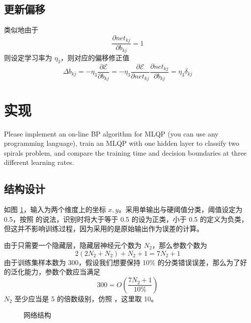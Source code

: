     \subsection{更新偏移}

    类似地由于
    \begin{equation*}
        \frac{\partial\mathit{net}_{kj}}{\partial b_{kj}} = 1
    \end{equation*}
    则设定学习率为 $\eta_3$，则对应的偏移修正值
    \begin{equation}\label{eq:bias}
        \Delta b_{kj} = -\eta_3\frac{\partial\mathcal{E}}{\partial b_{kj}}  = -\eta_3\frac{\partial\mathcal{E}}{\partial\mathit{net}_{kj}}\frac{\partial\mathit{net}_{kj}}{\partial b_{kj}} = \eta_3\delta_{kj}
    \end{equation}

    \section{实现}
    \begin{problem}
        Please implement an on-line BP algorithm for MLQP
(you can use any programming language), train an MLQP
with one hidden layer to classify two spirals problem,
and compare the training time and decision boundaries at
three different learning rates.
    \end{problem}

    \subsection{结构设计}

    如图 \ref{fig:network}，输入为两个维度上的坐标 $x,y$。采用单输出与硬阈值分类，阈值设定为 0.5，按照 \cite{gate} 的说法，识别时将大于等于 0.5 的设为正类，小于 0.5 的定义为负类，但这并不影响训练过程，因为采用的是原始输出作为误差的计算。

    由于只需要一个隐藏层，隐藏层神经元个数为 $N_2$，那么参数个数为
    \begin{equation*}
        2(2N_2+N_2) + N_2 + 1 = 7N_2 + 1
    \end{equation*}
    由于训练集样本数为 300，假设我们想要保持 10\% 的分类错误误差，那么为了好的泛化能力，参数个数应当满足
    \begin{equation*}
        300 = O\left(\frac{7N_2+1}{10\%}\right)
    \end{equation*}
    $N_2$ 至少应当是 5 的倍数级别，仿照 \cite{MLQP}，这里取 10。

    \begin{figure}[ht]
        \centering
        
        \caption{网络结构}\label{fig:network}
    \end{figure}

